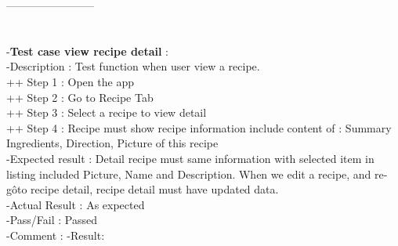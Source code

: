 \documentclass{article}
\begin{document}
        ------------------------\\ \\ \\
        -\textbf{Test case view recipe detail }: \\
        -Description : Test function when user view a recipe. \\
        ++ Step 1 : Open the app  \\
        ++ Step 2 : Go to Recipe Tab \\
        ++ Step 3 : Select a recipe to view detail  \\
        ++ Step 4 : Recipe must show recipe information include content of : Summary Ingredients, Direction, Picture of this recipe\\
        -Expected result : Detail recipe must same information with selected item in listing included Picture, Name and Description. When we edit a recipe, and re-gôto recipe detail, recipe detail must have updated data. \\
        -Actual Result : As expected \\
        -Pass/Fail : Passed \\
        -Comment : 
        -Result:
\end{document}
